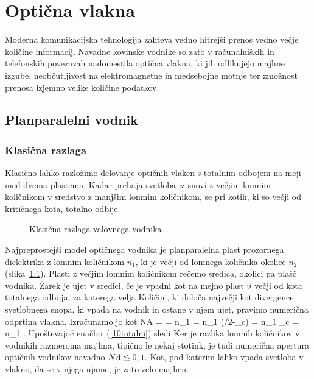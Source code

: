 
\chapter{Optična vlakna}
Moderna komunikacijska tehnologija zahteva vedno hitrejši prenos
vedno večje količine informacij. Navadne kovinske vodnike
so zato v računalniških in telefonskih povezavah nadomestila optična 
vlakna, ki jih odlikujejo majhne izgube, neobčutljivost na elektromagnetne
in medsebojne motnje ter zmožnost prenosa izjemno velike količine podatkov. 

\section{Planparalelni vodnik}
\subsection{Klasična razlaga}
Klasično lahko razložimo delovanje optičnih vlaken s totalnim odbojem
na meji med dvema plastema. Kadar prehaja svetloba iz snovi 
z večjim lomnim količnikom v sredstvo z manjšim lomnim količnikom,
se pri kotih, ki so večji od kritičnega kota, totalno odbije. 
\begin{figure}[h]
\centering
\def\svgwidth{120truemm} 

\caption{Klasična razlaga valovnega vodnika}
\label{fig:vodnik}
\end{figure}

Najpreprostejši model optičnega vodnika je planparalelna plast prozornega
dielektrika z lomnim količnikom $n_{1}$, ki je večji od lomnega količnika
okolice $n_2$ (slika~\ref{fig:vodnik}). 
Plasti z večjim lomnim količnikom rečemo sredica, okolici
pa plašč vodnika. Žarek je ujet v sredici, če je vpadni kot 
na mejno plast $\vartheta$ večji od kota totalnega odboja, 
za katerega velja 
Količini, ki določa največji kot divergence svetlobnega snopa, 
ki vpada na vodnik in ostane v njem ujet, pravimo
numerična odprtina vlakna. Izračunamo jo kot 
\beq
NA = \sin \alpha = n_1 \sin \beta = 
n_1 \sin(\pi/2-\vartheta_c) =
n_1 \cos\vartheta_c = n_1 .
\eeq
Upoštevajoč enačbo~(\ref{10totalni}) sledi 
Ker je razlika lomnih količnikov v vodnikih razmeroma majhna,
tipično le nekaj stotink, je tudi numerična apertura optičnih 
vodnikov navadno
$NA \lesssim 0,1 $. Kot, pod katerim lahko vpada svetloba
v vlakno, da se v njega ujame, je zato zelo majhen. 

